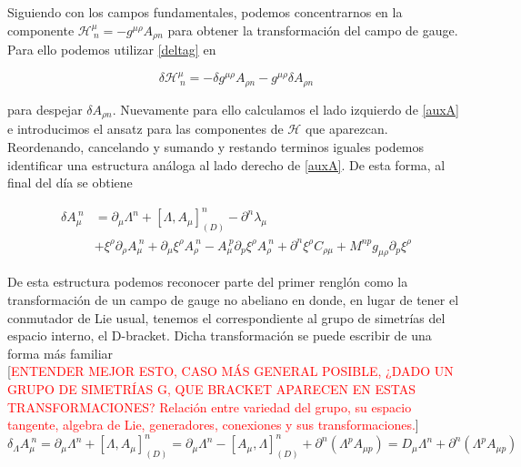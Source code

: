 \documentclass{article}
\numberwithin{equation}{section}
\begin{document}
\vspace{.5cm}

Siguiendo con los campos fundamentales, podemos concentrarnos en la componente $ \mathcal{H}^{\mu}_{\ n} = -g^{\mu \rho} A_{\rho n}$ para obtener la transformación del campo de gauge. Para ello podemos utilizar \ref{deltag} en

\begin{equation}\label{auxA}
\delta \mathcal{H}^{\mu}_{\ n} = -\delta g^{\mu \rho} A_{\rho n} -g^{\mu \rho} \delta A_{\rho n}
\end{equation}

para despejar $ \delta A_{\rho n} $. Nuevamente para ello calculamos el lado izquierdo de \ref{auxA} e introducimos el ansatz para las componentes de $ \mathcal{H} $ que aparezcan. Reordenando, cancelando y sumando y restando terminos iguales podemos identificar una estructura análoga al lado derecho de \ref{auxA}. De esta forma, al final del día se obtiene

\begin{equation}
\begin{aligned}\label{deltaA0}
\delta A_{\mu}^{\ n} &= \partial_{\mu} \Lambda^n + \left[ \Lambda, A_{\mu}\right]_{(D)}^n - \partial^n \lambda_{\mu}\\
&+ \xi^{\rho} \partial_{\rho} A_{\mu}^{\ n} +  \partial_{\mu} \xi^{\rho} A_{\rho}^{\ n} - A_{\mu}^{\ p} \partial_p \xi^{\rho} A_{\rho}^{\ n} +  \partial^n \xi^{\rho} C_{\rho \mu} + M^{n p} g_{\mu \rho} \partial_p \xi^{\rho}
\end{aligned}
\end{equation}

De esta estructura podemos reconocer parte del primer renglón como la transformación de un campo de gauge no abeliano en donde, en lugar de tener el conmutador de Lie usual, tenemos el correspondiente al grupo de simetrías del espacio interno, el D-bracket. Dicha transformación se puede escribir de una forma más familiar\\

[\textcolor{red}{ENTENDER MEJOR ESTO, CASO MÁS GENERAL POSIBLE, ¿DADO UN GRUPO DE SIMETRÍAS G, QUE BRACKET APARECEN EN ESTAS TRANSFORMACIONES? Relación entre variedad del grupo, su espacio tangente, algebra de Lie, generadores, conexiones y sus transformaciones.}]\\


\begin{equation}\label{deltaAlambda}
\delta_{\Lambda} A_{\mu}^{\ n} = \partial_{\mu} \Lambda^n + \left[ \Lambda, A_{\mu}\right]_{(D)}^n = \partial_{\mu} \Lambda^n - \left[A_{\mu}, \Lambda \right]_{(D)}^n + \partial^n \left( \Lambda^p A_{\mu p} \right) = D_{\mu}\Lambda^n + \partial^n \left( \Lambda^p A_{\mu p} \right)
\end{equation}
\end{document}
